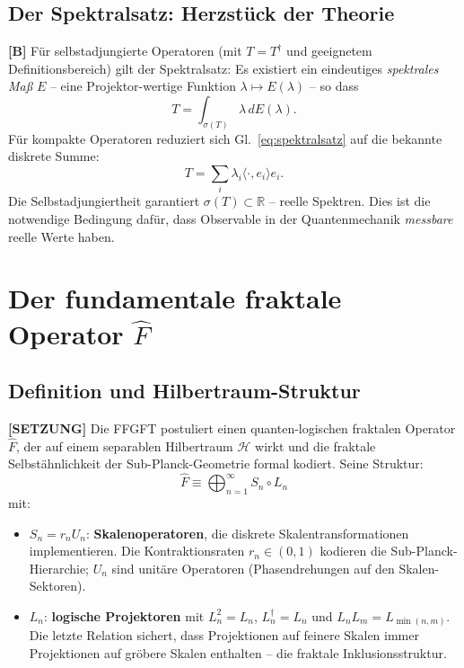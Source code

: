 \subsection{Der Spektralsatz: Herzstück der Theorie}

\textbf{[B]} Für selbstadjungierte Operatoren (mit $T = T^\dagger$ und
geeignetem Definitionsbereich) gilt der Spektralsatz:
Es existiert ein eindeutiges \emph{spektrales Maß} $E$ -- eine
Projektor-wertige Funktion $\lambda \mapsto E(\lambda)$ -- so dass
\begin{equation}
  T = \int_{\sigma(T)} \lambda \, dE(\lambda).
  \label{eq:spektralsatz}
\end{equation}
Für kompakte Operatoren reduziert sich Gl.~\eqref{eq:spektralsatz} auf
die bekannte diskrete Summe:
\begin{equation}
  T = \sum_i \lambda_i \langle \cdot, e_i \rangle e_i.
\end{equation}
Die Selbstadjungiertheit garantiert $\sigma(T) \subset \mathbb{R}$
-- reelle Spektren. Dies ist die notwendige Bedingung dafür, dass
Observable in der Quantenmechanik \emph{messbare} reelle Werte haben.

\section{Der fundamentale fraktale Operator $\hat{F}$}

\subsection{Definition und Hilbertraum-Struktur}

\textbf{[SETZUNG]} Die FFGFT postuliert einen quanten-logischen
fraktalen Operator $\hat{F}$, der auf einem separablen Hilbertraum
$\mathcal{H}$ wirkt und die fraktale Selbstähnlichkeit der
Sub-Planck-Geometrie formal kodiert. Seine Struktur:
\begin{equation}
  \hat{F} \equiv \bigoplus_{n=1}^{\infty} S_n \circ L_n
  \label{eq:F_def}
\end{equation}
mit:
\begin{itemize}
  \item $S_n = r_n U_n$: \textbf{Skalenoperatoren}, die diskrete
    Skalentransformationen implementieren. Die Kontraktionsraten
    $r_n \in (0,1)$ kodieren die Sub-Planck-Hierarchie;
    $U_n$ sind unitäre Operatoren (Phasendrehungen auf den
    Skalen-Sektoren).
  \item $L_n$: \textbf{logische Projektoren} mit $L_n^2 = L_n$,
    $L_n^\dagger = L_n$ und $L_n L_m = L_{\min(n,m)}$.
    Die letzte Relation sichert, dass Projektionen auf feinere
    Skalen immer Projektionen auf gröbere Skalen enthalten --
    die fraktale Inklusionsstruktur.
\end{itemize}

